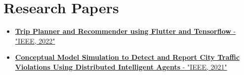 \documentclass[10pt, letterpaper]{article}
\newenvironment{highlights}{
    \begin{itemize}[
        topsep=0.06 cm,
        parsep=0.06 cm,
        partopsep=0pt,
        itemsep=0pt,
        leftmargin=0 cm + 10pt
    ]
}{
    \end{itemize}
}
\newenvironment{onecolentry}{
    \par\noindent
}{
    \par
}
\begin{document}



\section{Research Papers}
\begin{onecolentry}
\vspace{-2.5 mm}
    \begin{highlights}
        \item[--] \href{https://ieeexplore.ieee.org/document/9824468}{\textbf{Trip Planner and Recommender using Flutter and Tensorflow} - "IEEE, 2022"}
        \vspace{-0.1 cm}
        \item[--] \href{https://ieeexplore.ieee.org/document/9417881}{\textbf{Conceptual Model Simulation to Detect and Report City Traffic Violations Using Distributed Intelligent Agents} - "IEEE, 2021"}
    \end{highlights}
\end{onecolentry}

\end{document}
